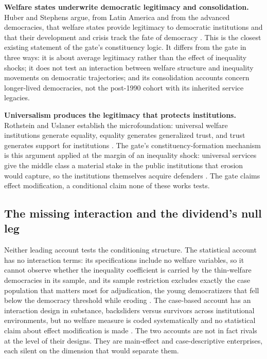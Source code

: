 \textbf{Welfare states underwrite democratic legitimacy and consolidation.} Huber and Stephens argue, from Latin America and from the advanced democracies, that welfare states provide legitimacy to democratic institutions and that their development and crisis track the fate of democracy \citep{HuberStephens2001, HuberStephens2012}. This is the closest existing statement of the gate's constituency logic. It differs from the gate in three ways: it is about average legitimacy rather than the effect of inequality shocks; it does not test an interaction between welfare structure and inequality movements on democratic trajectories; and its consolidation accounts concern longer-lived democracies, not the post-1990 cohort with its inherited service legacies.

\textbf{Universalism produces the legitimacy that protects institutions.} Rothstein and Uslaner establish the microfoundation: universal welfare institutions generate equality, equality generates generalized trust, and trust generates support for institutions \citep{RothsteinUslaner2005}. The gate's constituency-formation mechanism is this argument applied at the margin of an inequality shock: universal services give the middle class a material stake in the public institutions that erosion would capture, so the institutions themselves acquire defenders \citep{Pierson1993, SossSchram2007, RothsteinUslaner2005}. The gate claims effect modification, a conditional claim none of these works tests.

\subsection{The missing interaction and the dividend's null leg}

Neither leading account tests the conditioning structure. The statistical account has no interaction terms: its specifications include no welfare variables, so it cannot observe whether the inequality coefficient is carried by the thin-welfare democracies in its sample, and its sample restriction excludes exactly the case population that matters most for adjudication, the young democratizers that fell below the democracy threshold while eroding \citep{RauStokes2025}. The case-based account has an interaction design in substance, backsliders versus survivors across institutional environments, but no welfare measure is coded systematically and no statistical claim about effect modification is made \citep{HaggardKaufman2021}. The two accounts are not in fact rivals at the level of their designs. They are main-effect and case-descriptive enterprises, each silent on the dimension that would separate them.

